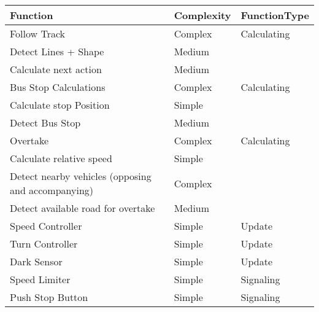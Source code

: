 











\begin{table}[H]
\centering
\begin{tabular}{|l|l|l|}
\hline
\rowcolor[HTML]{FFFFFF} 
\textbf{Function}                                  & \textbf{Complexity} & \textbf{FunctionType} \\ \hline
\rowcolor[HTML]{9B9B9B} 
Follow Track                                       & Complex    & Calculating  \\ \hline
\rowcolor[HTML]{C0C0C0} 
Detect Lines + Shape                               & Medium     &              \\ \hline
\rowcolor[HTML]{C0C0C0} 
Calculate next action                              & Medium     &              \\ \hline
\rowcolor[HTML]{9B9B9B} 
Bus Stop Calculations                              & Complex    & Calculating  \\ \hline
\rowcolor[HTML]{C0C0C0} 
Calculate stop Position                            & Simple     &              \\ \hline
\rowcolor[HTML]{C0C0C0} 
Detect Bus Stop                                    & Medium     &              \\ \hline
\rowcolor[HTML]{9B9B9B} 
Overtake                                           & Complex    & Calculating  \\ \hline
\rowcolor[HTML]{C0C0C0} 
Calculate relative speed                           & Simple     &              \\ \hline
\rowcolor[HTML]{C0C0C0} 
Detect nearby vehicles (opposing and accompanying) & Complex    &              \\ \hline
\rowcolor[HTML]{C0C0C0} 
Detect available road for overtake                 & Medium     &              \\ \hline
Speed Controller                                   & Simple     & Update       \\ \hline
Turn Controller                                    & Simple     & Update       \\ \hline
Dark Sensor                                        & Simple     & Update       \\ \hline
Speed Limiter                             & Simple     & Signaling    \\ \hline
Push Stop Button                                   & Simple     & Signaling    \\ \hline

\end{tabular}
\end{table}
